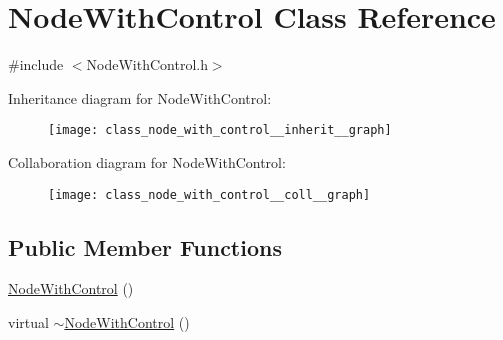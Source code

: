 \hypertarget{class_node_with_control}{}\section{Node\+With\+Control Class Reference}
\label{class_node_with_control}


{\ttfamily \#include $<$Node\+With\+Control.\+h$>$}



Inheritance diagram for Node\+With\+Control\+:\nopagebreak
\begin{figure}[H]
\begin{center}
\leavevmode
\texttt{[image: class\_node\_with\_control\_\_inherit\_\_graph]}
\end{center}
\end{figure}


Collaboration diagram for Node\+With\+Control\+:\nopagebreak
\begin{figure}[H]
\begin{center}
\leavevmode
\texttt{[image: class\_node\_with\_control\_\_coll\_\_graph]}
\end{center}
\end{figure}
\subsection*{Public Member Functions}
\begin{DoxyCompactItemize}
\item 
\hyperlink{class_node_with_control_ab0a223aca65e289aaee682dadfbefb5c}{Node\+With\+Control} ()
\item 
virtual \hyperlink{class_node_with_control_a6e752e38f0e233e7debfaaf4ae26fb2d}{$\sim$\+Node\+With\+Control} ()
\end{DoxyCompactItemize}
